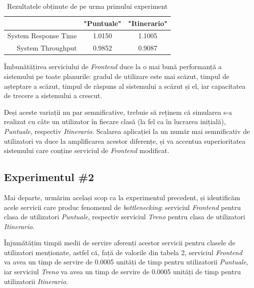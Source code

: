 \documentclass[12pt]{article}
\begin{document}
            \begin{table}[!h]
                \centering
                \begin{tabular}{r|cc}
                    \multicolumn{1}{c|}{} & "Puntuale" & "Itinerario" \\ \hline
                    System Response Time  & 1.0150     & 1.1005       \\
                    System Throughput     & 0.9852     & 0.9087      
                \end{tabular}
                \caption{Rezultatele obținute de pe urma primului experiment}
            \end{table}

            Îmbunătățirea serviciului de \textit{Frontend} duce la o mai bună performanță a sistemului pe toate planurile: gradul de utilizare este mai scăzut, timpul de așteptare a scăzut, timpul de răspuns al sistemului a scăzut și el, iar capacitatea de trecere a sistemului a crescut.

            Deși aceste variații nu par semnificative, trebuie să reținem că simularea s-a realizat cu câte un utilizator în fiecare clasă (la fel ca în lucrarea inițială), \textit{Puntuale}, respectiv \textit{Itinerario}. Scalarea aplicației la un număr mai semnificativ de utilizatori va duce la amplificarea acestor diferențe, și va accentua superioritatea sistemului care conține serviciul de \textit{Frontend} modificat.
        
        \subsection{Experimentul \#2}
            Mai departe, urmărim același scop ca la experimentul precedent, și identificăm acele servicii care produc fenomenul de \textit{bottlenecking}: serviciul \textit{Frontend} pentru clasa de utilizatori \textit{Puntuale}, respectiv serviciul \textit{Treno} pentru clasa de utilizatori \textit{Itinerario}.
            
            Înjumătățim timpii medii de servire aferenți acestor servicii pentru clasele de utilizatori menționate, astfel că, față de valorile din tabela 2, serviciul \textit{Frontend} va avea un timp de servire de 0.0005 unități de timp pentru utilizatorii \textit{Puntuale}, iar serviciul \textit{Treno} va avea un timp de servire de 0.0005 unități de timp pentru utilizatorii \textit{Itinerario}.
            \pagebreak
\end{document}
